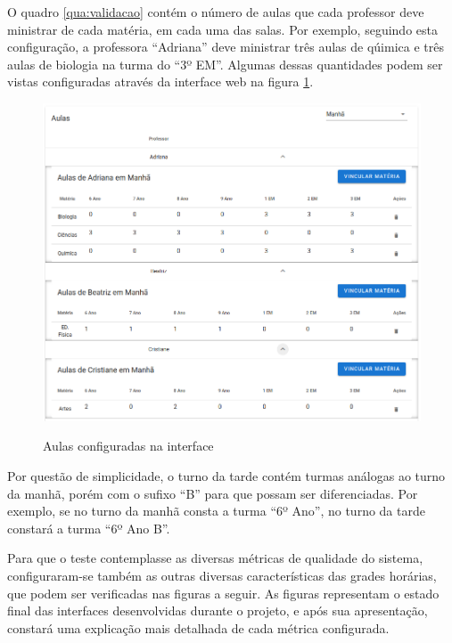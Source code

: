 O quadro \ref{qua:validacao} contém o número de aulas que cada professor deve ministrar de cada matéria, em cada uma das salas. Por exemplo, seguindo esta configuração, a professora ``Adriana'' deve ministrar três aulas de qúimica e três aulas de biologia na turma do ``3º EM''. Algumas dessas quantidades podem ser vistas configuradas através da interface web na figura \ref{fig:aulas_validacao}.

\begin{figure}[!htb]
	\centering
	\caption{Aulas configuradas na interface}
	\includegraphics[width=1\textwidth]{./dados/figuras/aulas_validacao}
	\label{fig:aulas_validacao}
\end{figure}

Por questão de simplicidade, o turno da tarde contém turmas análogas ao turno da manhã, porém com o sufixo ``B'' para que possam ser diferenciadas. Por exemplo, se no turno da manhã consta a turma ``6º Ano'', no turno da tarde constará a turma ``6º Ano B''.

Para que o teste contemplasse as diversas métricas de qualidade do sistema, configuraram-se também as outras diversas características das grades horárias, que podem ser verificadas nas figuras a seguir. As figuras representam o estado final das interfaces desenvolvidas durante o projeto, e após sua apresentação, constará uma explicação mais detalhada de cada métrica configurada.

